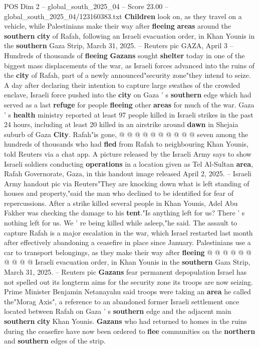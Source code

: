 \begin{textsample}{POS Dim 2 – global\_south\_2025\_04 – Score 23.00 – global\_south\_2025\_04/123160383.txt}  \label{ex:f2_pos_280}
\textbf{Children} look on, as they travel on a vehicle, while Palestinians make their way after \textbf{fleeing} \textbf{areas} around the \textbf{southern} \textbf{city} of Rafah, following an Israeli evacuation order, in Khan Younis in the \textbf{southern} Gaza Strip, March 31, 2025. -- Reuters pic GAZA, April 3 -- Hundreds of thousands of \textbf{fleeing} \textbf{Gazans} sought \textbf{shelter} today in one of the biggest mass displacements of the war, as Israeli forces advanced into the ruins of the \textbf{city} of Rafah, part of a newly announced"security zone"they intend to seize.
A day after declaring their intention to capture large swathes of the crowded enclave, Israeli force pushed into the \textbf{city} on Gaza ' s \textbf{southern} edge which had served as a last \textbf{refuge} for people \textbf{fleeing} other \textbf{areas} for much of the war.
Gaza ' s \textbf{health} ministry reported at least 97 people killed in Israeli strikes in the past 24 hours, including at least 20 killed in an airstrike around \textbf{dawn} in Shejaia suburb of Gaza \textbf{City}.
Rafah"is gone, @ @ @ @ @ @ @ @ @ @ seven among the hundreds of thousands who had \textbf{fled} from Rafah to neighbouring Khan Younis, told Reuters via a chat app.
A picture released by the Israeli Army says to show Israeli soldiers conducting \textbf{operations} in a location given as Tel Al-Sultan \textbf{area}, Rafah Governorate, Gaza, in this handout image released April 2, 2025. -- Israeli Army handout pic via Reuters"They are knocking down what is left standing of houses and property,"said the man who declined to be identified for fear of repercussions.
After a strike killed several people in Khan Younis, Adel Abu Fakher was checking the damage to his \textbf{tent}."Is anything left for us?
There ' s nothing left for us.
We ' re being killed while asleep,"he said.
The assault to capture Rafah is a major escalation in the war, which Israel restarted last month after effectively abandoning a ceasefire in place since January.
Palestinians use a car to transport belongings, as they make their way after \textbf{fleeing} @ @ @ @ @ @ @ @ @ @ Israeli evacuation order, in Khan Younis in the \textbf{southern} Gaza Strip, March 31, 2025. -- Reuters pic \textbf{Gazans} fear permanent depopulation Israel has not spelled out its longterm aims for the security zone its troops are now seizing.
Prime Minister Benjamin Netanayahu said troops were taking an \textbf{area} he called the"Morag Axis", a reference to an abandoned former Israeli settlement once located between Rafah on Gaza ' s \textbf{southern} edge and the adjacent main \textbf{southern} \textbf{city} Khan Younis. \textbf{Gazans} who had returned to homes in the ruins during the ceasefire have now been ordered to \textbf{flee} communities on the \textbf{northern} and \textbf{southern} edges of the strip.

\end{textsample}
